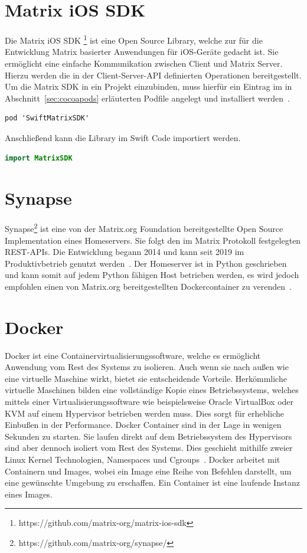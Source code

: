     \section{Matrix iOS SDK}\label{sec:matrix-sdk}
    Die Matrix iOS SDK \footnote{https://github.com/matrix-org/matrix-ios-sdk} ist eine Open Source Library, welche zur für die Entwicklung Matrix basierter Anwendungen für iOS-Geräte gedacht ist.
    Sie ermöglicht eine einfache Kommunikation zwischen Client und Matrix Server.
    Hierzu werden die in der Client-Server-API definierten Operationen bereitgestellt.
    Um die Matrix SDK in ein Projekt einzubinden, muss hierfür ein Eintrag im in Abschnitt~\ref{sec:cocoapods} erläuterten Podfile angelegt und installiert werden~\cite{matrixiossdk}.
    \begin{lstlisting}[language={},label={lst:matrtix-sdk}]
        pod 'SwiftMatrixSDK'
    \end{lstlisting}
    Anschließend kann die Library im Swift Code importiert werden.
    \begin{lstlisting}[language=swift,label={lst:matrtix-sdk-swift}]
        import MatrixSDK
    \end{lstlisting}

    \section{Synapse}\label{sec:synapse}
    Synapse\footnote{https://github.com/matrix-org/synapse/} ist eine von der Matrix.org Foundation bereitgestellte Open Source Implementation eines Homeservers.
    Sie folgt den im Matrix Protokoll festgelegten REST-APIs.
    Die Entwicklung begann 2014 und kann seit 2019 im Produktivbetrieb genutzt werden~\cite{synapse}.
    Der Homeserver ist in Python geschrieben und kann somit auf jedem Python fähigen Host betrieben werden, es wird jedoch empfohlen einen von Matrix.org bereitgestellten Dockercontainer zu verenden~\cite{synapse2}.

    \section{Docker}\label{sec:docker}
    Docker ist eine Containervirtualisierungssoftware, welche es ermöglicht Anwendung vom Rest des Systems zu isolieren.
    Auch wenn sie nach außen wie eine virtuelle Maschine wirkt, bietet sie entscheidende Vorteile.
    Herkömmliche virtuelle Maschinen bilden eine vollständige Kopie eines Betriebssystems, welches mittels einer Virtualisierungssoftware wie beispielsweise Oracle VirtualBox oder KVM auf einem Hypervisor betrieben werden muss.
    Dies sorgt für erhebliche Einbußen in der Performance.
    Docker Container sind in der Lage in wenigen Sekunden zu starten.
    Sie laufen direkt auf dem Betriebssystem des Hypervisors sind aber dennoch isoliert vom Rest des Systems.
    Dies geschieht mithilfe zweier Linux Kernel Technologien, Namespaces und Cgroups~\cite{docker}.
    Docker arbeitet mit Containern und Images, wobei ein Image eine Reihe von Befehlen darstellt, um eine gewünschte Umgebung zu erschaffen.
    Ein Container ist eine laufende Instanz eines Images.



